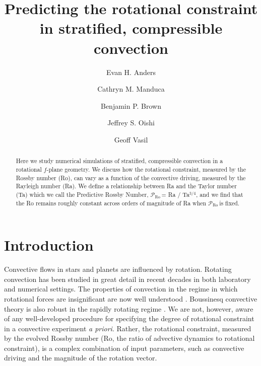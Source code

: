 \documentclass[twocolumn, amsmath, amsfonts, amssymb]{aastex62}
\newcommand{\pro}{\ensuremath{\mathcal{P}_{\text{Ro}}\,}}
\begin{document}
\newcommand{\AB}{\citetalias{anders&brown2017}}

\title{Predicting the rotational constraint in stratified, compressible convection}


\author{Evan H. Anders}
\author{Cathryn M. Manduca}
\author{Benjamin P. Brown}
\author{Jeffrey S. Oishi}
\author{Geoff Vasil}


\begin{abstract}
Here we study numerical simulations of stratified, compressible convection in a
rotational $f$-plane geometry. We discuss how the rotational constraint,
measured by the Rossby number (Ro), can vary as a function of the convective driving,
measured by the Rayleigh number (Ra). We define a relationship between Ra and the
Taylor number (Ta) which we call the Predictive Rossby Number, 
\pro = Ra / Ta$^{3/4}$, and we find that the Ro remains roughly constant
across orders of magnitude of Ra when \pro is fixed. 
\end{abstract}


\section{Introduction}
\label{sec:intro}
Convective flows in stars and planets are influenced by rotation. 
Rotating convection has been studied in great detail in
recent decades in both laboratory and numerical settings. The
properties of convection in the regime in which rotational forces are
insignificant are now well understood \citep{king&all2009, zhong&all2009, 
cheng&all2015}. Boussinesq convective theory is also robust
in the rapidly rotating regime \citep{julien&all2012, stellmach&all2014,
gastine&all2016}. We are not, however, aware of any well-developed
procedure for specifying the degree of rotational constraint
in a convective experiment \emph{a priori}. Rather, the rotational
constraint, measured by the evolved Rossby number
(Ro, the ratio of advective dynamics to rotational constraint), is a complex
combination of input parameters, such as convective driving and the
magnitude of the rotation vector.
\end{document}
